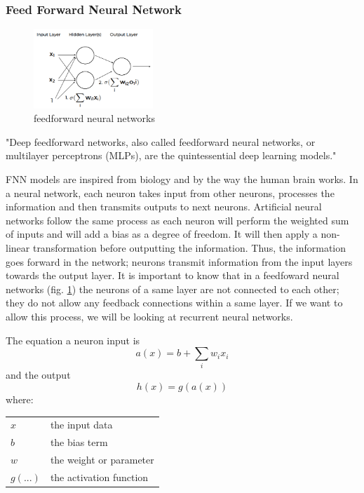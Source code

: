 \documentclass[6pt,letter]{article}\usepackage[]{graphicx}\usepackage[]{color}
\makeatletter
\newenvironment{conditions}
  {\par\vspace{\abovedisplayskip}\noindent\begin{tabular}{>{$}l<{$} @{${}={}$} l}}
  {\end{tabular}\par\vspace{\belowdisplayskip}}
\makeatother
\begin{document}
\subsubsection{Feed Forward Neural Network}
\begin{figure}
  \begin{center}
    \includegraphics[width=0.4\textwidth]{figure/feedforward_neural_networks.png}
  \end{center}
  \caption{feedforward neural networks}
  \label{fig:attention}
\end{figure}

"Deep feedforward networks, also called feedforward neural networks, or multilayer perceptrons (MLPs), are the quintessential deep learning models." \cite{Goodfellow-et-al-2016}

\ac{FNN} models are inspired from biology and by the way the human brain works. In a neural network, each neuron takes input from other neurons, processes the information and then transmits outputs to next neurons. Artificial neural networks follow the same process as each neuron will perform the weighted sum of inputs and will add a bias as a degree of freedom. It will then apply a non-linear transformation before outputting the information. Thus, the information goes forward in the network; neurons transmit information from the input layers towards the output layer. It is important to know that in a feedfoward neural networks (fig. \ref{fig:attention}) the neurons of a same layer are not connected to each other; they do not allow any feedback connections within a same layer. If we want to allow this process, we will be looking at recurrent neural networks.

The equation a neuron input is  
\begin{equation}
a(x) = b +\sum_{i}{w_i x_i}
\end{equation}
and the output
\begin{equation}
h(x) = g(a(x))
\end{equation}
where:
\begin{conditions}
 x     &  the input data \\
 b     &  the bias term \\
 w     &  the weight or parameter \\   
 g(...) &  the activation function
\end{conditions}
\end{document}

